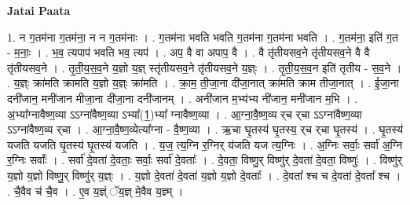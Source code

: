 \documentclass[17pt]{extarticle}
\begin{document}
\textbf{Jatai Paata} \newline

1. न ग॒तम॑ना ग॒तम॑ना॒ न न ग॒तम॑नाः । . ग॒तम॑ना भवति भवति ग॒तम॑ना ग॒तम॑ना भवति । . ग॒तम॑ना॒ इति॑ ग॒त - म॒नाः॒ । . भ॒व॒ त्यपाप॑ भवति भव॒ त्यप॑ । . अप॒ वै वा अपाप॒ वै । . वै तृ॑तीयसव॒ने तृ॑तीयसव॒ने वै वै तृ॑तीयसव॒ने । . तृ॒ती॒य॒स॒व॒ने य॒ज्ञो य॒ज्ञ् स्तृ॑तीयसव॒ने तृ॑तीयसव॒ने य॒ज्ञ्ः । . तृ॒ती॒य॒स॒व॒न इति॑ तृतीय - स॒व॒ने । . य॒ज्ञ्ः क्रा॑मति क्रामति य॒ज्ञो य॒ज्ञ्ः क्रा॑मति । . क्रा॒म॒ ती॒जा॒ना दी॑जा॒नात् क्रा॑मति क्राम तीजा॒नात् । . ई॒जा॒ना दनी॑जान॒ मनी॑जान मीजा॒ना दी॑जा॒ना दनी॑जानम् । . अनी॑जान म॒भ्य॑भ्य नी॑जान॒ मनी॑जान म॒भि । . अ॒भ्या᳚ग्नावैष्ण॒व्या ऽऽग्ना॑वैष्ण॒व्या ऽभ्या᳚(1॒)भ्या᳚ ग्नावैष्ण॒व्या । . आ॒ग्ना॒वै॒ष्ण॒व्य र्‌च र्‌चा ऽऽग्ना॑वैष्ण॒व्या ऽऽग्ना॑वैष्ण॒व्य र्‌चा । . आ॒ग्ना॒वै॒ष्ण॒व्येत्या᳚ग्ना - वै॒ष्ण॒व्या । . ऋ॒चा घृ॒तस्य॑ घृ॒तस्य॒ र्‌च र्‌चा घृ॒तस्य॑ । . घृ॒तस्य॑ यजति यजति घृ॒तस्य॑ घृ॒तस्य॑ यजति । . य॒ज॒ त्य॒ग्नि र॒ग्निर् य॑जति यज त्य॒ग्निः । . अ॒ग्निः सर्वाः॒ सर्वा॑ अ॒ग्नि र॒ग्निः सर्वाः᳚ । . सर्वा॑ दे॒वता॑ दे॒वताः॒ सर्वाः॒ सर्वा॑ दे॒वताः᳚ । . दे॒वता॒ विष्णु॒र् विष्णु॑र् दे॒वता॑ दे॒वता॒ विष्णुः॑ । . विष्णु॑र् य॒ज्ञो य॒ज्ञो विष्णु॒र् विष्णु॑र् य॒ज्ञ्ः । . य॒ज्ञो दे॒वता॑ दे॒वता॑ य॒ज्ञो य॒ज्ञो दे॒वताः᳚ । . दे॒वता᳚ श्च च दे॒वता॑ दे॒वता᳚ श्च । . चै॒वैव च॑ चै॒व । . ए॒व य॒ज्ञ्ं ॅय॒ज्ञ् मे॒वैव य॒ज्ञ्म् । \newline
\end{document}
